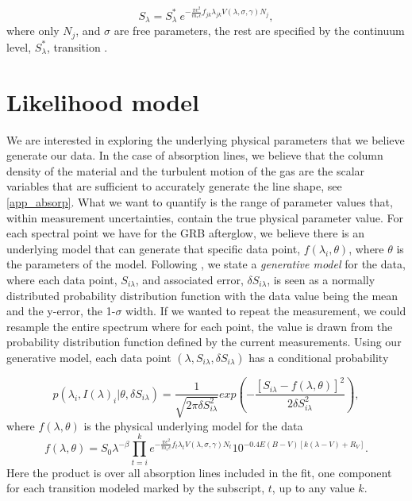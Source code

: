 \documentclass[a4paper,fleqn,usenatbib]{mnras}
\begin{document}
\begin{equation} 
S_\lambda = S_\lambda^* \  e^{ - \frac{\pi  e^2}{m_e c} f_{jk} \lambda_{jk} V(\lambda, \sigma, \gamma)  N_j}, 
\end{equation}
where only $N_j$, and $\sigma$ are free parameters, the rest are specified by the continuum level, $S_\lambda^*$, transition \citep{TepperGarcia2006}.


\section{Likelihood model}

We are interested in exploring the underlying physical parameters that we believe generate our data. In the case of absorption lines, we believe that the column density of the material and the turbulent motion of the gas are the scalar variables that are sufficient to accurately generate the line shape, see \ref{app_absorp}. What we want to quantify is the range of parameter values that, within measurement uncertainties, contain the true physical parameter value. For each spectral point we have for the GRB afterglow, we believe there is an underlying model that can generate that specific data point, $f(\lambda_i, \theta)$, where $\theta$ is the parameters of the model. Following \citet{Hogg2010}, we state a \textit{generative model} for the data, where each data point, $S_{i \lambda}$,  and associated error, $\delta S_{i \lambda}$,  is seen as a normally distributed probability distribution function with the data value being the mean and the y-error, the 1-$\sigma$ width. If we wanted to repeat the measurement, we could resample the entire spectrum where for each point, the value is drawn from the probability distribution function defined by the current measurements. Using our generative model, each data point $(\lambda, S_{i \lambda},\delta S_{i \lambda} )$ has a conditional probability


\begin{equation} 
p(\lambda_i, I(\lambda)_{i} | \theta,  \delta S_{i \lambda})  
=   \frac{1}{\sqrt{2 \pi \delta S_{i \lambda}^2 }}  exp \left(   - \frac{[S_{i \lambda} - f(\lambda, \theta)]^2}{2 \delta S_{i \lambda}^2}    \right),
\end{equation}
where $f(\lambda, \theta)$ is the physical underlying model for the data
\begin{equation} 
f(\lambda, \theta)
=   S_{0} \lambda^{-\beta} \prod_{t=i}^{k} e^{ - \frac{\pi  e^2}{m_e c} f_{t} \lambda_{t} V(\lambda, \sigma, \gamma)  N_t}  10 ^{-0.4 E(B-V)[k(\lambda - V) + R_V]}.
\end{equation}
Here the product is over all absorption lines included in the fit, one component for each transition modeled marked by the subscript, $t$, up to any value $k$. 
\end{document}
